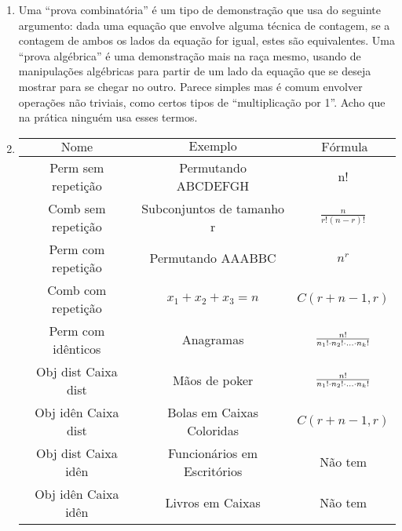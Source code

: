 \documentclass{article}
\begin{document}
\begin{enumerate}
    \item Uma ``prova combinatória'' é um tipo de demonstração que usa do seguinte argumento: dada uma equação que envolve alguma técnica de contagem, se a contagem de ambos os lados da equação for igual, estes são equivalentes. Uma ``prova algébrica'' é uma demonstração mais na raça mesmo, usando de manipulações algébricas para partir de um lado da equação que se deseja mostrar para se chegar no outro. Parece simples mas é comum envolver operações não triviais, como certos tipos de ``multiplicação por 1''. Acho que na prática ninguém usa esses termos.

    \item 
        \begin{sloppy}
            \begin{center}
                \begin{tabular}{|c c | c|} 
                    \hline
                    \( \textrm{Nome} \)  & \( \textrm{Exemplo} \) & \(\ \textrm{Fórmula} \) \\ [0.5ex]
                    \hline\hline
                    Perm sem repetição & Permutando ABCDEFGH & n!  \\ 
                    \hline
                    Comb sem repetição & Subconjuntos de tamanho r & \( \frac{n}{r!(n-r)!} \)   \\
                    \hline
                    Perm com repetição & Permutando AAABBC & \( n^{r} \)   \\
                    \hline
                    Comb com repetição & \( x_1 + x_2 + x_3 = n \)  & \( C(r+n-1,r) \)   \\ 
                    \hline
                    Perm com idênticos & Anagramas  & \( \frac{n!}{n_1! \cdot n_2! \cdot \mathellipsis \cdot n_k!} \)   \\ 
                    \hline
                    Obj dist Caixa dist & Mãos de poker  & \( \frac{n!}{n_1! \cdot n_2! \cdot \mathellipsis \cdot n_k! }\)    \\ 
                    \hline
                    Obj idên Caixa dist & Bolas em Caixas Coloridas  & \( C(r+n-1,r) \)     \\ 
                    \hline
                    Obj dist Caixa idên & Funcionários em Escritórios  & Não tem    \\ 
                    \hline
                    Obj idên Caixa idên & Livros em Caixas  & Não tem    \\ [1ex]
                    \hline
                \end{tabular}
            \end{center}
        \end{sloppy}


\end{enumerate}
\end{document}
